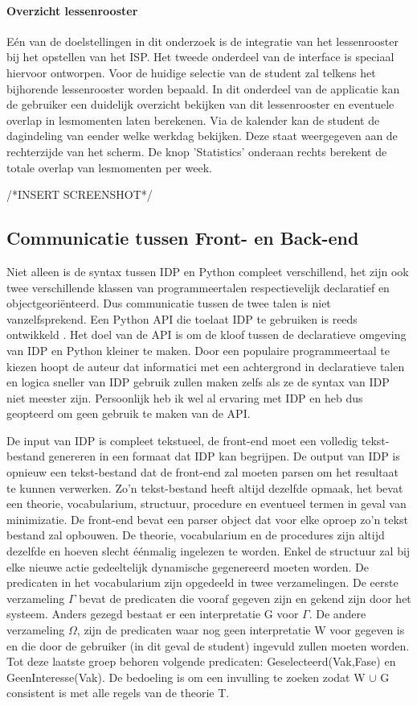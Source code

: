 \paragraph{Overzicht lessenrooster} 
E\'{e}n van de doelstellingen in dit onderzoek is de integratie van het lessenrooster bij het opstellen van het ISP. Het tweede onderdeel van de interface is speciaal hiervoor ontworpen. Voor de huidige selectie van de student zal telkens het bijhorende lessenrooster worden bepaald. In dit onderdeel van de applicatie kan de gebruiker een duidelijk overzicht bekijken van dit lessenrooster en eventuele overlap in lesmomenten laten berekenen. Via de kalender kan de student de dagindeling van eender welke werkdag bekijken. Deze staat weergegeven aan de rechterzijde van het scherm. De knop 'Statistics' onderaan rechts berekent de totale overlap van lesmomenten per week.

/*INSERT SCREENSHOT*/


\subsection{Communicatie tussen Front- en Back-end}
Niet alleen is de syntax tussen IDP en Python compleet verschillend, het zijn ook twee verschillende klassen van programmeertalen respectievelijk declaratief en objectgeori\"{e}nteerd. Dus communicatie tussen de twee talen is niet vanzelfsprekend. Een Python API die toelaat IDP te gebruiken is reeds ontwikkeld \citep{vennekens2015lowering}. Het doel van de API is om de kloof tussen de declaratieve omgeving van IDP en Python kleiner te maken. Door een populaire programmeertaal te kiezen hoopt de auteur dat informatici met een achtergrond in declaratieve talen en logica sneller van IDP gebruik zullen maken zelfs als ze de syntax van IDP niet meester zijn. Persoonlijk heb ik wel al ervaring met IDP en heb dus geopteerd om geen gebruik te maken van de API. 

De input van IDP is compleet tekstueel, de front-end moet een volledig tekst-bestand genereren in een formaat dat IDP kan begrijpen. De output van IDP is opnieuw een tekst-bestand dat de front-end zal moeten parsen om het resultaat te kunnen verwerken. Zo'n tekst-bestand heeft altijd dezelfde opmaak, het bevat een theorie, vocabularium, structuur, procedure en eventueel termen in geval van minimizatie. De front-end bevat een parser object dat voor elke oproep zo'n tekst bestand zal opbouwen. De theorie, vocabularium en de procedures zijn altijd dezelfde en hoeven slecht \'{e}\'{e}nmalig ingelezen te worden. Enkel de structuur zal bij elke nieuwe actie gedeeltelijk dynamische gegenereerd moeten worden. De predicaten in het vocabularium zijn opgedeeld in twee verzamelingen. De eerste verzameling $\Gamma$ bevat de predicaten die vooraf gegeven zijn en gekend zijn door het systeem. Anders gezegd bestaat er een interpretatie G voor $\Gamma$. De andere verzameling $\Omega$, zijn de predicaten waar nog geen interpretatie W voor gegeven is en die door de gebruiker (in dit geval de student) ingevuld zullen moeten worden. Tot deze laatste groep behoren volgende predicaten: Geselecteerd(Vak,Fase) en GeenInteresse(Vak). De bedoeling is om een invulling te zoeken zodat W $\cup$ G consistent is met alle regels van de theorie T.